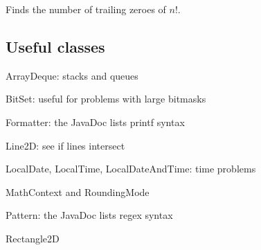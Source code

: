 Finds the number of trailing zeroes of $n!$.



\subsection*{Useful classes}

ArrayDeque: stacks and queues

BitSet: useful for problems with large bitmasks

Formatter: the JavaDoc lists printf syntax

Line2D: see if lines intersect

LocalDate, LocalTime, LocalDateAndTime: time problems

MathContext and RoundingMode

Pattern: the JavaDoc lists regex syntax

Rectangle2D

\newpage